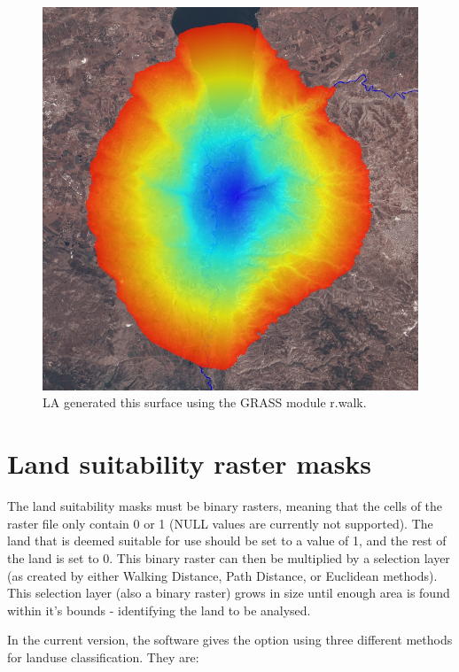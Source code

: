 \begin{figure}[htbp] \centering
\includegraphics[scale=0.29]{./images/rwalkShuna.jpg}
   \caption{LA generated this surface using the GRASS module r.walk.}
   \label{fig:rwalk} \end{figure}

\section{Land suitability raster masks} 

The land suitability masks must be binary rasters, meaning that the cells of
the raster file only contain 0 or 1 (NULL values are currently not supported).
The land that is deemed suitable for use should be set to a value of 1, and the
rest of the land is set to 0.  This binary raster  can then be multiplied by a
selection layer (as created by either Walking Distance, Path Distance,
or Euclidean methods).  This selection layer (also a binary raster) grows in size until enough area is
found within it's bounds - identifying the land to be analysed.

In the current version, the software gives the option using three different
methods for landuse classification.  They are: 

